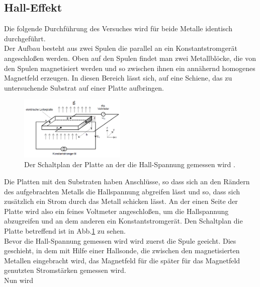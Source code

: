 \subsection{Hall-Effekt}
Die folgende Durchführung des Versuches wird für beide Metalle identisch durchgeführt.\\
Der Aufbau besteht aus zwei Spulen die parallel an ein Konstantstromgerät angeschloßen werden. 
Oben auf den Spulen findet man zwei Metallblöcke, die von den Spulen magnetisiert werden und so zwischen ihnen ein annähernd homogenes Magnetfeld erzeugen.
In diesen Bereich lässt sich, auf eine Schiene, das zu untersuchende Substrat auf einer Platte aufbringen.\\
\begin{figure}[H]
    \centering
    \includegraphics[width=0.45\textwidth]{images/hall.PNG}
    \caption{Der Schaltplan der Platte an der die Hall-Spannung gemessen wird \protect \cite{V311}.}
    \label{img:hall2}
  \end{figure}
Die Platten mit den Substraten haben Anschlüsse, so dass sich an den Rändern des aufgebrachten Metalls die Hallspannung abgreifen lässt und so, 
dass sich zusätzlich ein Strom durch das Metall schicken lässt.
An der einen Seite der Platte wird also ein feines Voltmeter angeschloßen, um die Hallspannung abzugreifen und an dem anderen ein Konstantstromgerät.
Den Schaltplan die Platte betreffend ist in Abb.\ref{img:hall2} zu sehen.\\
Bevor die Hall-Spannung gemessen wird wird zuerst die Spule geeicht. Dies geschieht, in dem mit Hilfe einer Hallsonde, die zwischen den magnetisierten Metallen eingebracht wird,
das Magnetfeld für die später für das Magnetfeld genutzten Stromstärken gemessen wird.\\
Nun wird 